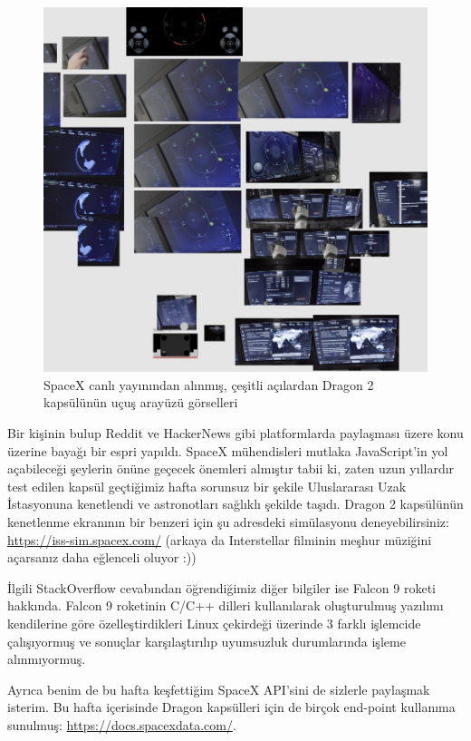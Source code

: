\documentclass[11pt]{article}
\begin{document}
\begin{figure}[htbp]
\centering
\includegraphics[width=.9\linewidth]{gorseller/spacex-dragon-ucus-arayuzu.jpeg}
\caption{SpaceX canlı yayınından alınmış, çeşitli açılardan Dragon 2 kapsülünün uçuş arayüzü görselleri}
\end{figure}

Bir kişinin bulup Reddit ve HackerNews gibi platformlarda paylaşması üzere
konu üzerine bayağı bir espri yapıldı. SpaceX mühendisleri mutlaka
JavaScript'in yol açabileceği şeylerin önüne geçecek önemleri almıştır tabii
ki, zaten uzun yıllardır test edilen kapsül geçtiğimiz hafta sorunsuz bir
şekile Uluslararası Uzak İstasyonuna kenetlendi ve astronotları sağlıklı
şekilde taşıdı. Dragon 2 kapsülünün kenetlenme ekranının bir benzeri için şu
adresdeki simülasyonu deneyebilirsiniz: \url{https://iss-sim.spacex.com/} (arkaya da
Interstellar filminin meşhur müziğini açarsanız daha eğlenceli oluyor :))

İlgili StackOverflow cevabından öğrendiğimiz diğer bilgiler ise Falcon 9
roketi hakkında. Falcon 9 roketinin C/C++ dilleri kullanılarak oluşturulmuş
yazılımı kendilerine göre özelleştirdikleri Linux çekirdeği üzerinde 3 farklı
işlemcide çalışıyormuş ve sonuçlar karşılaştırılıp uyumsuzluk durumlarında
işleme alınmıyormuş.

Ayrıca benim de bu hafta keşfettiğim SpaceX API'sini de sizlerle paylaşmak
isterim. Bu hafta içerisinde Dragon kapsülleri için de birçok end-point
kullanıma sunulmuş: \url{https://docs.spacexdata.com/}.
\end{document}
